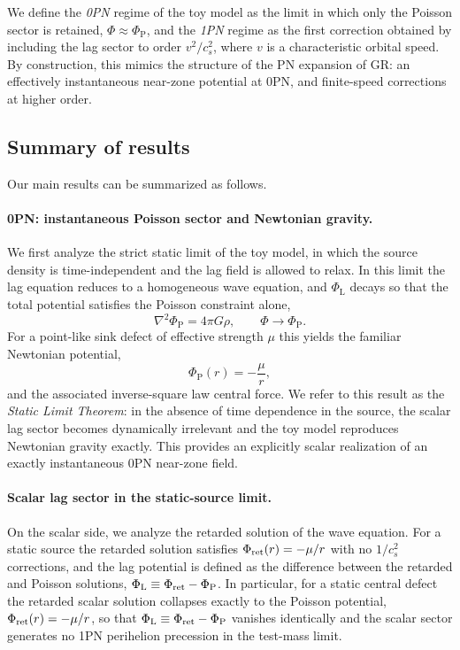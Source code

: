 \documentclass[11pt]{article}
\newcommand{\cS}{c_s}
\newcommand{\PhiP}{\Phi_{\mathrm{P}}}
\newcommand{\PhiL}{\Phi_{\mathrm{L}}}
\newcommand{\PhiTot}{\Phi}
\begin{document}
We define the \emph{0PN} regime of the toy model as the limit in which only the Poisson sector is retained, $\PhiTot \approx \PhiP$, and the \emph{1PN} regime as the first correction obtained by including the lag sector to order $v^2/\cS^2$, where $v$ is a characteristic orbital speed. By construction, this mimics the structure of the PN expansion of GR: an effectively instantaneous near-zone potential at 0PN, and finite-speed corrections at higher order.

\subsection{Summary of results}

Our main results can be summarized as follows.

\paragraph{0PN: instantaneous Poisson sector and Newtonian gravity.}

We first analyze the strict static limit of the toy model, in which the source density is time-independent and the lag field is allowed to relax. In this limit the lag equation reduces to a homogeneous wave equation, and $\PhiL$ decays so that the total potential satisfies the Poisson constraint alone,
\begin{equation}
  \nabla^2 \PhiP = 4\pi G \rho, \qquad \PhiTot \to \PhiP.
\end{equation}
For a point-like sink defect of effective strength $\mu$ this yields the familiar Newtonian potential,
\begin{equation}
  \PhiP(r) = -\frac{\mu}{r},
\end{equation}
and the associated inverse-square law central force. We refer to this result as the \emph{Static Limit Theorem}: in the absence of time dependence in the source, the scalar lag sector becomes dynamically irrelevant and the toy model reproduces Newtonian gravity exactly. This provides an explicitly scalar realization of an exactly instantaneous 0PN near-zone field.

\paragraph{Scalar lag sector in the static-source limit.}

On the scalar side, we analyze the retarded solution of the wave equation. For a static source the retarded solution satisfies $\Phi_{\rm ret}(r) = -\mu/r$ with no $1/\cS^2$ corrections, and the lag potential is defined as the difference between the retarded and Poisson solutions, $\PhiL \equiv \Phi_{\rm ret} - \PhiP$. In particular, for a static central defect the retarded scalar solution collapses exactly to the Poisson potential, $\Phi_{\rm ret}(r) = -\mu/r$, so that $\PhiL \equiv \Phi_{\rm ret} - \PhiP$ vanishes identically and the scalar sector generates no 1PN perihelion precession in the test-mass limit.
\end{document}
